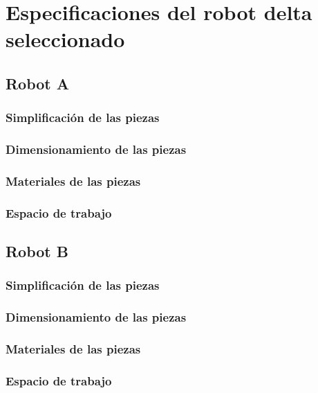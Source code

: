 \chapter{Especificaciones del robot delta seleccionado}\label{CAP5}

\section{Robot A}
    \subsection{Simplificación de las piezas}
    \subsection{Dimensionamiento de las piezas}
    \subsection{Materiales de las piezas}
    \subsection{Espacio de trabajo}

\section{Robot B}
    \subsection{Simplificación de las piezas}
    \subsection{Dimensionamiento de las piezas}
    \subsection{Materiales de las piezas}
    \subsection{Espacio de trabajo}


